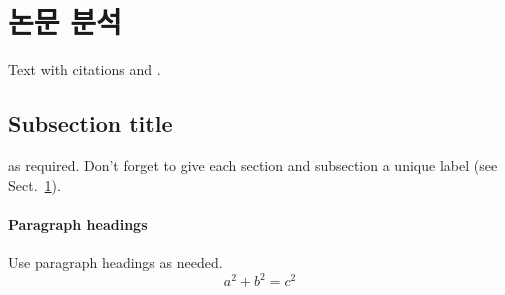 \section{논문 분석}
\label{sec:1}
Text with citations \cite{RefB} and \cite{RefJ}.
\subsection{Subsection title}
\label{sec:11}
as required. Don't forget to give each section
and subsection a unique label (see Sect.~\ref{sec:1}).
\paragraph{Paragraph headings} Use paragraph headings as needed.
\begin{equation}
a^2+b^2=c^2
\end{equation}

